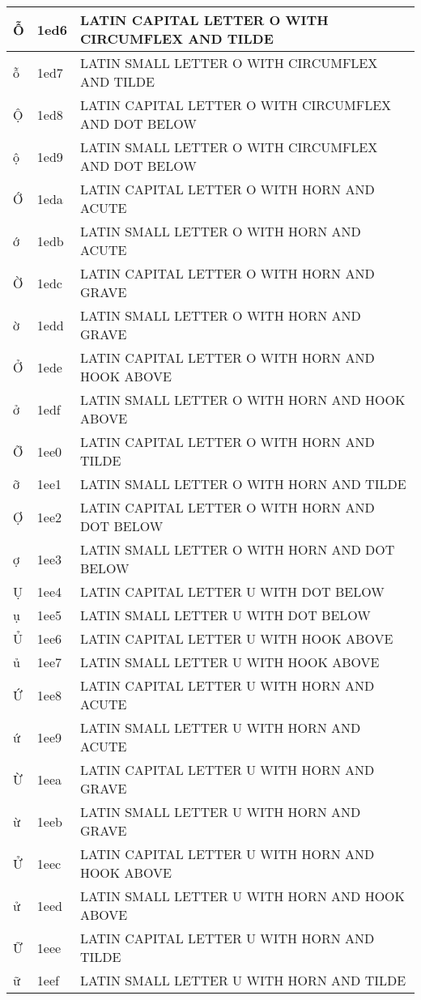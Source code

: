 \documentclass[12pt,letterpaper,openany]{book}
\begin{document}
\begin{center}
\begin{supertabular}{|m{0.25in}|m{0.5in}|m{4in}|}
Ỗ & 1ed6 & LATIN CAPITAL LETTER O WITH CIRCUMFLEX AND TILDE\\\hline
ỗ & 1ed7 & LATIN SMALL LETTER O WITH CIRCUMFLEX AND TILDE\\\hline
Ộ & 1ed8 & LATIN CAPITAL LETTER O WITH CIRCUMFLEX AND DOT BELOW\\\hline
ộ & 1ed9 & LATIN SMALL LETTER O WITH CIRCUMFLEX AND DOT BELOW\\\hline
Ớ & 1eda & LATIN CAPITAL LETTER O WITH HORN AND ACUTE\\\hline
ớ & 1edb & LATIN SMALL LETTER O WITH HORN AND ACUTE\\\hline
Ờ & 1edc & LATIN CAPITAL LETTER O WITH HORN AND GRAVE\\\hline
ờ & 1edd & LATIN SMALL LETTER O WITH HORN AND GRAVE\\\hline
Ở & 1ede & LATIN CAPITAL LETTER O WITH HORN AND HOOK ABOVE\\\hline
ở & 1edf & LATIN SMALL LETTER O WITH HORN AND HOOK ABOVE\\\hline
Ỡ & 1ee0 & LATIN CAPITAL LETTER O WITH HORN AND TILDE\\\hline
ỡ & 1ee1 & LATIN SMALL LETTER O WITH HORN AND TILDE\\\hline
Ợ & 1ee2 & LATIN CAPITAL LETTER O WITH HORN AND DOT BELOW\\\hline
ợ & 1ee3 & LATIN SMALL LETTER O WITH HORN AND DOT BELOW\\\hline
Ụ & 1ee4 & LATIN CAPITAL LETTER U WITH DOT BELOW\\\hline
ụ & 1ee5 & LATIN SMALL LETTER U WITH DOT BELOW\\\hline
Ủ & 1ee6 & LATIN CAPITAL LETTER U WITH HOOK ABOVE\\\hline
ủ & 1ee7 & LATIN SMALL LETTER U WITH HOOK ABOVE\\\hline
Ứ & 1ee8 & LATIN CAPITAL LETTER U WITH HORN AND ACUTE\\\hline
ứ & 1ee9 & LATIN SMALL LETTER U WITH HORN AND ACUTE\\\hline
Ừ & 1eea & LATIN CAPITAL LETTER U WITH HORN AND GRAVE\\\hline
ừ & 1eeb & LATIN SMALL LETTER U WITH HORN AND GRAVE\\\hline
Ử & 1eec & LATIN CAPITAL LETTER U WITH HORN AND HOOK ABOVE\\\hline
ử & 1eed & LATIN SMALL LETTER U WITH HORN AND HOOK ABOVE\\\hline
Ữ & 1eee & LATIN CAPITAL LETTER U WITH HORN AND TILDE\\\hline
ữ & 1eef & LATIN SMALL LETTER U WITH HORN AND TILDE\\\hline

\end{supertabular}
\end{center}
\end{document}
